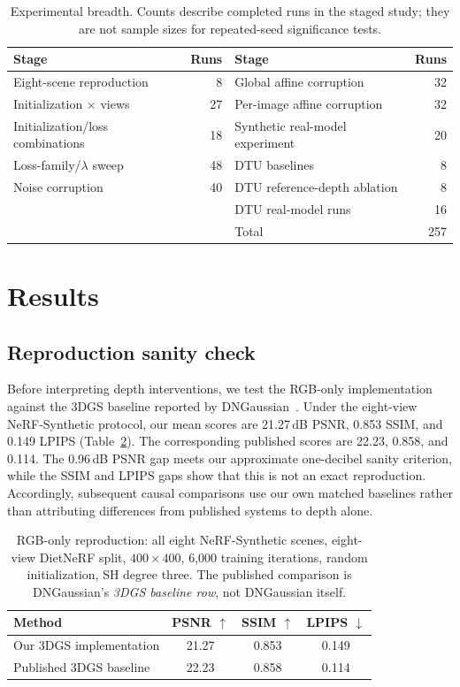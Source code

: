 \documentclass[10pt,a4paper]{article}
\begin{document}
\begin{table}[!htbp]\centering\small
\caption{Experimental breadth. Counts describe completed runs in the staged study;
they are not sample sizes for repeated-seed significance tests.}
\label{tab:stages}
\begin{tabular}{lrlr}
\toprule
Stage & Runs & Stage & Runs\\
\midrule
Eight-scene reproduction & 8 & Global affine corruption & 32\\
Initialization $\times$ views & 27 & Per-image affine corruption & 32\\
Initialization/loss combinations & 18 & Synthetic real-model experiment & 20\\
Loss-family/$\lambda$ sweep & 48 & DTU baselines & 8\\
Noise corruption & 40 & DTU reference-depth ablation & 8\\
 & & DTU real-model runs & 16\\
\midrule
 & & Total & 257\\
\bottomrule
\end{tabular}
\end{table}

\section{Results}

\subsection{Reproduction sanity check}

Before interpreting depth interventions, we test the RGB-only implementation against
the 3DGS baseline reported by DNGaussian~\cite{li2024}. Under the eight-view
NeRF-Synthetic protocol, our mean scores are 21.27\,dB PSNR, 0.853 SSIM, and 0.149
LPIPS (Table~\ref{tab:repro}). The corresponding published scores are 22.23, 0.858,
and 0.114. The 0.96\,dB PSNR gap meets our approximate one-decibel sanity criterion,
while the SSIM and LPIPS gaps show that this is not an exact reproduction.
Accordingly, subsequent causal comparisons use our own matched baselines rather than
attributing differences from published systems to depth alone.

\begin{table}[!htbp]\centering\small
\caption{RGB-only reproduction: all eight NeRF-Synthetic scenes, eight-view DietNeRF
split, $400\times400$, 6,000 training iterations, random initialization, SH degree
three. The published comparison is DNGaussian's \emph{3DGS baseline row}, not
DNGaussian itself.}
\label{tab:repro}
\begin{tabular}{lccc}
\toprule
Method & PSNR $\uparrow$ & SSIM $\uparrow$ & LPIPS $\downarrow$\\
\midrule
Our 3DGS implementation & 21.27 & 0.853 & 0.149\\
Published 3DGS baseline~\cite{li2024} & 22.23 & 0.858 & 0.114\\
\bottomrule
\end{tabular}
\end{table}
\end{document}
